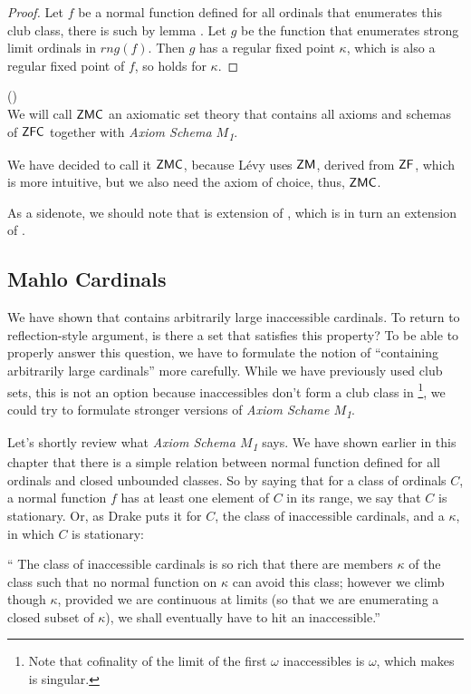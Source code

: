 \begin{proof}
Let $f$ be a normal function defined for all ordinals that enumerates this club class, there is such by lemma . %
Let $g$ be the function that enumerates strong limit ordinals in $rng(f)$. %
Then $g$ has a regular fixed point $\kappa$, which is also a regular fixed point of $f$, so  holds for $\kappa$.

% 
\end{proof}

\begin{definition}{()}\\
We will call $\sf{ZMC}$ an axiomatic set theory that contains all axioms and schemas of $\sf{ZFC}$ together with \emph{Axiom Schema $M$\textsubscript{1}}.
\end{definition}
We have decided to call it $\sf{ZMC}$, because Lévy uses $\sf{ZM}$, derived from $\sf{ZF}$, which is more intuitive, but we also need the axiom of choice, thus, $\sf{ZMC}$.

As a sidenote, we should note that  is extension of , which is in turn an extension of .

\subsection{Mahlo Cardinals}
We have shown that  contains arbitrarily large inaccessible cardinals. To return to reflection-style argument, is there a set that satisfies this property? To be able to properly answer this question, we have to formulate the notion of ``containing arbitrarily large cardinals'' more carefully. While we have previously used club sets, this is not an option because inaccessibles don't form a club class in \footnote{Note that cofinality of the limit of the first $\omega$ inaccessibles is $\omega$, which makes is singular.}, we could try to formulate stronger versions of \emph{Axiom Schame $M$\textsubscript{1}}. 

Let's shortly review what \emph{Axiom Schema $M$\textsubscript{1}} says. We have shown earlier in this chapter that there is a simple relation between normal function defined for all ordinals and closed unbounded classes. So by saying that for a class of ordinals $C$, a normal function $f$ has at least one element of $C$ in its range, we say that $C$ is stationary. Or, as Drake puts it for $C$, the class of inaccessible cardinals, and a $\kappa$, in which $C$ is stationary:
\begin{displayquote}
`` The class of inaccessible cardinals is so rich that there are members $\kappa$ of the class such that no normal function on $\kappa$ can avoid this class; however we climb though $\kappa$, provided we are continuous at limits (so that we are enumerating a closed subset of $\kappa$), we shall eventually have to hit an inaccessible.''
\end{displayquote}

